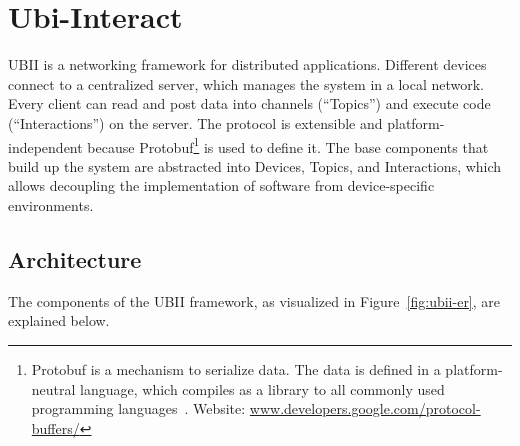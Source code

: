 \section{Ubi-Interact}\label{section:ubi-interact}

\gls{UBII} is a networking framework for distributed applications. Different devices connect to a centralized server, which manages the system in a local network. Every client can read and post data into channels (\enquote{Topics}) and execute code (\enquote{Interactions}) on the server. The protocol is extensible and platform-independent because \gls{Protobuf}\footnote{Protobuf is a mechanism to serialize data. The data is defined in a platform-neutral language, which compiles as a library to all commonly used programming languages~\cite{GoogleLLC.2019b}. Website: \href{https://developers.google.com/protocol-buffers/}{www.developers.google.com/protocol-buffers/}} is used to define it. The base components that build up the system are abstracted into Devices, Topics, and Interactions, which allows decoupling the implementation of software from device-specific environments.


\subsection{Architecture}\label{subsection:architecture}

The components of the \gls{UBII} framework, as visualized in Figure~\ref{fig:ubii-er}, are explained below.

